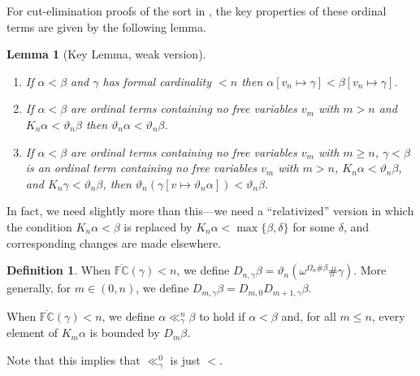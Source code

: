 \documentclass[11pt]{amsart}
\newtheorem{lemma}[theorem]{Lemma}
\theoremstyle{definition}
\newtheorem{definition}[theorem]{Definition}
\begin{document}
For cut-elimination proofs of the sort in \cite{2403.17922}, the key properties of these ordinal terms are given by the following lemma.

\begin{lemma}[Key Lemma, weak version]
  \begin{enumerate}
  \item If $\alpha<\beta$ and $\gamma$ has formal cardinality $<n$ then $\alpha[v_n\mapsto\gamma]<\beta[v_n\mapsto\gamma]$.
  \item If $\alpha<\beta$ are ordinal terms containing no free variables $v_m$ with $m> n$ and $K_n\alpha<\vartheta_n\beta$ then $\vartheta_n\alpha<\vartheta_n\beta$.
  \item If $\alpha<\beta$ are ordinal terms containing no free variables $v_m$ with $m\geq n$, $\gamma<\beta$ is an ordinal term containing no free variables $v_m$ with $m>n$, $K_n\alpha<\vartheta_n\beta$, and $K_n\gamma<\vartheta_n\beta$, then $\vartheta_n(\gamma[v\mapsto\vartheta_n\alpha])<\vartheta_n\beta$.
\end{enumerate}
\end{lemma}
In fact, we need slightly more than this---we need a ``relativized'' version in which the condition $K_n\alpha<\beta$ is replaced by $K_n\alpha<\max\{\beta,\delta\}$ for some $\delta$, and corresponding changes are made elsewhere.

\begin{definition}
  When $\overline{\mathbb{FC}}(\gamma)<n$, we define $D_{n,\gamma}\beta=\vartheta_n(\omega^{\Omega_n\#\beta}\#\gamma)$.  More generally, for $m\in(0,n)$, we define $D_{m,\gamma}\beta=D_{m,0}D_{m+1,\gamma}\beta$.
  
  When $\overline{\mathbb{FC}}(\gamma)<n$, we define $\alpha\ll^n_\gamma\beta$ to hold if $\alpha<\beta$ and, for all $m\leq n$, every element of $K_m\alpha$ is bounded by $D_m\beta$.
\end{definition}
Note that this implies that $\ll^0_\gamma$ is just $<$.
\end{document}
